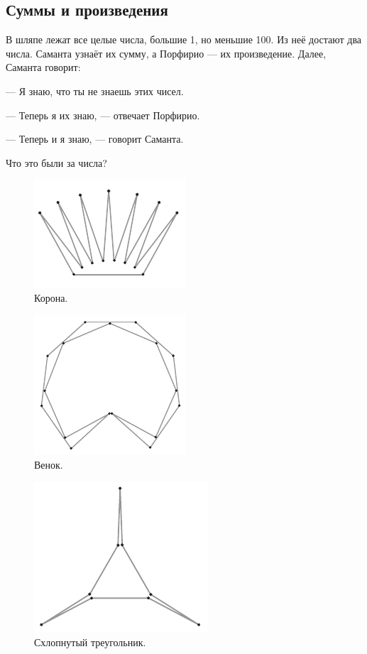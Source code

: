 \subsection*{Суммы и произведения}

В шляпе лежат все целые числа, большие 1, но меньшие 100.
Из неё достают два числа.
Саманта узнаёт их сумму, а Порфирио --- их произведение.
Далее, Саманта говорит:

--- Я знаю, что ты не знаешь этих чисел.

--- Теперь я их знаю, --- отвечает Порфирио.

--- Теперь и я знаю, --- говорит Саманта.

Что это были за числа?

\begin{figure}[htb!]
\centering
\includegraphics[scale=.95]{pics/korona}
\caption{Корона.}
\label{pic:korona}
\end{figure}

\begin{figure}[htb!]
\centering
\includegraphics[scale=.95]{pics/wreath}
\caption{Венок.}
\label{pic:wreath}
\end{figure}

\begin{figure}[htb!]
\centering
\includegraphics[scale=.95]{pics/treug}
\caption{Схлопнутый треугольник.}
\label{pic:treug}
\end{figure}

